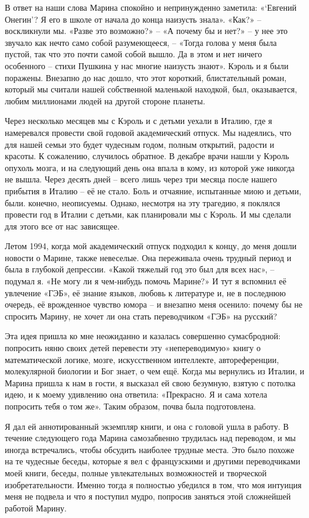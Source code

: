 \documentclass[../main.tex]{subfiles}
\begin{document}
В ответ на наши слова Марина спокойно и непринужденно заметила: «\enquote*{Евгений Онегин}? Я его в школе от начала до конца наизусть знала». «Как?» \--- воскликнули мы. «Разве это возможно?» \--- «А почему бы и нет?» \--- у нее это звучало как нечто само собой разумеющееся, \--- «Тогда голова у меня была пустой, так что это почти самой собой вышло. Да в этом и нет ничего особенного \--- стихи Пушкина у нас многие наизусть знают». Кэроль и я были поражены. Внезапно до нас дошло, что этот короткий, блистательный роман, который мы считали нашей собственной маленькой находкой, был, оказывается, любим миллионами людей на другой стороне планеты.

Через несколько месяцев мы с Кэроль и с детьми уехали в Италию, где я намеревался провести свой годовой академический отпуск. Мы надеялись, что для нашей семьи это будет чудесным годом, полным открытий, радости и красоты. К сожалению, случилось обратное. В декабре врачи нашли у Кэроль опухоль мозга, и на следующий день она впала в кому, из которой уже никогда не вышла. Через десять дней \--- всего лишь через три месяца после нашего прибытия в Италию \--- её не стало. Боль и отчаяние, испытанные миою и детьми, были. конечно, неописуемы. Однако, несмотря на эту трагедию, я поклялся провести год в Италии с детьми, как планировали мы с Кэроль. И мы сделали для этого все от нас зависящее.

Летом 1994, когда мой академический отпуск подходил к концу, до меня дошли новости о Марине, также невеселые. Она переживала очень трудный период и была в глубокой депрессии. «Какой тяжелый год это был для всех нас», \--- подумал я. «Не могу ли я чем-нибудь помочь Марине?» И тут я вспомнил её увлечение «ГЭБ», её знание языков, любовь к литературе и, не в последнюю очередь, её врожденное чувство юмора \--- и внезапно меня осенило: почему бы не спросить Марину, не хочет ли она стать переводчиком «ГЭБ» на русский?

Эта идея пришла ко мне неожиданно и казалась совершенно сумасбродной: попросить няню своих детей перевести эту «непереводимую» книгу о математической логике, мозге, искусственном интеллекте, автореференции, молекулярной биологии и Бог знает, о чем ещё. Когда мы вернулись из Италии, и Марина пришла к нам в гости, я высказал ей свою безумную, взятую с потолка идею, и к моему удивлению она ответила: «Прекрасно. Я и сама хотела попросить тебя о том же». Таким образом, почва была подготовлена.

Я дал ей аннотированный экземпляр книги, и она с головой ушла в работу. В течение следующего года Марина самозабвенно трудилась над переводом, и мы иногда встречались, чтобы обсудить наиболее трудные места. Это было похоже на те чудесные беседы, которые я вел с французскими и другими переводчиками моей книги, беседы, полные увлекательных возможностей и творческой изобретательности. Именно тогда я полностью убедился в том, что моя интуиция меня не подвела и что я поступил мудро, попросив заняться этой сложнейшей работой Марину.
\end{document}
